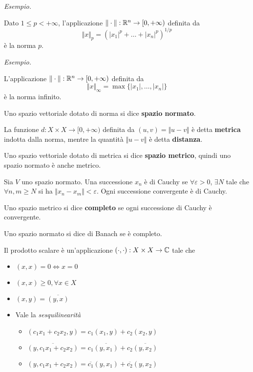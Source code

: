 \textit{Esempio.}

Dato $1\leq p < + \infty $, l'applicazione $ \Vert \cdot \Vert : \mathbb{R}^{n}\rightarrow [0, + \infty)$ definita da
\begin{equation*}
\Vert x \Vert_{p} = \left(| x_{1}|^{p} + \dotsc + | x_{n}|^{p}\right)^{1/p}
\end{equation*}
è la norma $p$.

\textit{Esempio.}

L'applicazione $ \Vert \cdot \Vert : \mathbb{R}^{n}\rightarrow [0, + \infty)$ definita da
\begin{equation*}
\Vert x \Vert_{\infty} = \max\{| x_{1}|, \dotsc, | x_{n}| \}
\end{equation*}
è la norma infinito.
\begin{defn}
Uno spazio vettoriale dotato di norma si dice \textbf{spazio normato}.
\end{defn}
\begin{defn}
[Metrica]
La funzione $d: X\times X\rightarrow [0, + \infty)$ definita da $(u, v) = \Vert u - v \Vert $ è detta \textbf{metrica} indotta dalla norma, mentre la quantità $ \Vert u - v \Vert $ è detta \textbf{distanza}.
\end{defn}
\begin{defn}
Uno spazio vettoriale dotato di metrica si dice \textbf{spazio metrico}, quindi uno spazio normato è anche metrico.
\end{defn}
\begin{defn}
Sia $V$ uno spazio normato. Una successione $x_{n}$ è di Cauchy se $\forall \varepsilon > 0$, $\exists N$ tale che $\forall n, m\geq N$ si ha $ \Vert x_{n} - x_{m} \Vert < \varepsilon $. Ogni successione convergente è di Cauchy.
\end{defn}
\begin{defn}
Uno spazio metrico si dice \textbf{completo} se ogni successione di Cauchy è convergente.
\end{defn}
\begin{defn}
Uno spazio normato si dice di Banach se è completo.
\end{defn}
\begin{defn}
Il prodotto scalare è un'applicazione $(\cdot, \cdot) : X\times X\rightarrow \mathbb{C}$ tale che
\begin{itemize}
\item $(x, x) = 0\iff x = 0$
\item $(x, x) \geq 0, \forall x\in X$
\item $(x, y) = \overline{(y, x)}$
\item Vale la \textit{sesquilinearità}
\begin{itemize}
\item $(c_{1} x_{1} + c_{2} x_{2}, y) = c_{1}(x_{1}, y) + c_{2}(x_{2}, y)$
\item $\overline{(y, c_{1} x_{1} + c_{2} x_{2})} = c_{1}\overline{(y, x_{1})} + c_{2}\overline{(y, x_{2})}$
\item $(y, c_{1} x_{1} + c_{2} x_{2}) = \overline{c_{1}}(y, x_{1}) + \overline{c_{2}}(y, x_{2})$
\end{itemize}
\end{itemize}
\end{defn}
